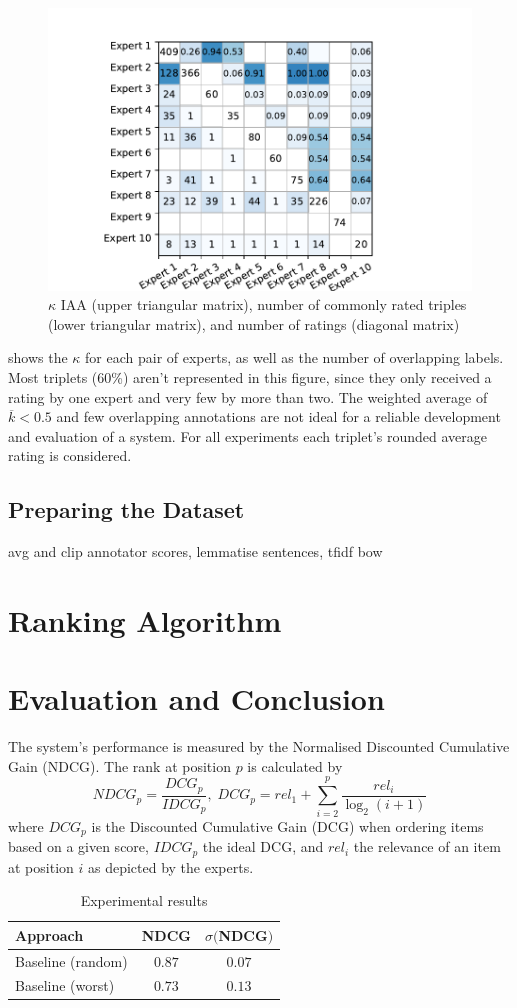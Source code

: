 \begin{figure}
	\includegraphics[width=\linewidth]{iaa}
	\caption{$\kappa$ IAA (upper triangular matrix), number of commonly rated triples (lower triangular matrix), and number of ratings (diagonal matrix)}
	\label{fig:iaa}
\end{figure}

 shows the $\kappa$ for each pair of experts, as well as the number of overlapping labels. Most triplets (60\%) aren't represented in this figure, since they only received a rating by one expert and very few by more than two. The weighted average of $\overline{k}<0.5$ and few overlapping annotations are not ideal for a reliable development and evaluation of a system. For all experiments each triplet's rounded average rating is considered.

\subsection{Preparing the Dataset}

avg and clip annotator scores, lemmatise sentences, tfidf bow

\section{Ranking Algorithm}

\section{Evaluation and Conclusion}
The system's performance is measured by the Normalised Discounted Cumulative Gain (NDCG). The rank at position $p$ is calculated by
\begin{equation}
NDCG_p = \frac{DCG_p}{IDCG_p},\;
DCG_p = rel_1 + \sum_{i=2}^{p} \frac{rel_i}{\log_2(i+1)}
\end{equation}
where $DCG_p$ is the Discounted Cumulative Gain (DCG) when ordering items based on a given score, $IDCG_p$ the ideal DCG, and $rel_i$ the relevance of an item at position $i$ as depicted by the experts.

\begin{table}
	\caption{Experimental results}
	\label{tab:freq}
	\begin{tabular}{lcc}
		\toprule
		Approach & NDCG & $\sigma ($NDCG$)$\\
		\midrule
		Baseline (random) & $0.87$ & $0.07$\\
		Baseline (worst) & $0.73$ & $0.13$\\
		\bottomrule
	\end{tabular}
\end{table}